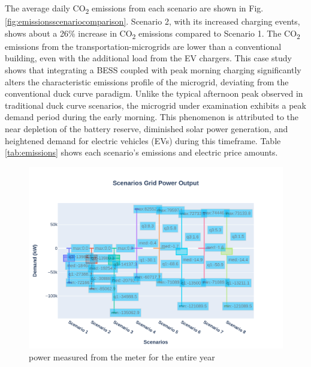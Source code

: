 \documentclass[conference,  usletter]{IEEEtran}
\begin{document}
\indent The average daily CO\textsubscript{2} emissions from each scenario are shown in Fig. \ref{fig:emissionsscenariocomparison}. 
Scenario 2, with its increased charging events, shows about a 26\% increase in CO\textsubscript{2} emissions compared to Scenario 1. The CO\textsubscript{2} emissions from the transportation-microgrids are lower than a conventional building, even with the additional load from the EV chargers. This case study shows that integrating a BESS coupled with peak morning charging significantly alters the characteristic emissions profile of the microgrid, deviating from the conventional duck curve paradigm. Unlike the typical afternoon peak observed in traditional duck curve scenarios, the microgrid under examination exhibits a peak demand period during the early morning. This phenomenon is attributed to the near depletion of the battery reserve, diminished solar power generation, and heightened demand for electric vehicles (EVs) during this timeframe. Table \ref{tab:emissions} shows each scenario's emissions and electric price amounts.
\begin{figure}
\centering
\includegraphics[width=1\linewidth]{Fig/Option_3/scenarios_power_output_boxplot}
\caption{power measured from the meter for the entire year}
\label{fig:scenariospoweroutputboxplot}
\end{figure}
\end{document}
